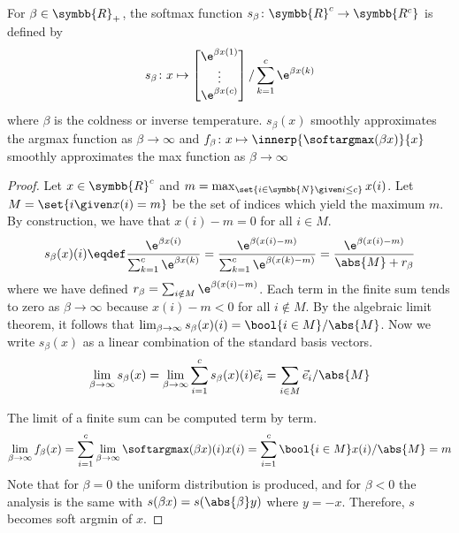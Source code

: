 \begin{lemma}
	For \(\beta \in \symbb{R}_+\), the softmax function \(s_{\beta} \colon \symbb{R}^c \to \symbb{R^c}\) is defined by
	\begin{equation*}
		s_{\beta} \colon x \mapsto \begin{bmatrix}
			\e^{\beta x(1)} \\
			\vdots          \\
			\e^{\beta x(c)}
		\end{bmatrix} / \sum_{k=1}^c \e^{\beta x(k)}
	\end{equation*}
	where \(\beta\) is the coldness or inverse temperature.
	\(s_{\beta}(x)\) smoothly approximates the argmax function as \(\beta \to \infty\) and \(f_{\beta} \colon x \mapsto \innerp{\softargmax(\beta x)}{x}\) smoothly approximates the max function as \(\beta \to \infty\)
\end{lemma}
\begin{proof}
	Let \(x \in \symbb{R}^c\) and \(m = \max_{\set{i \in \symbb{N} \given i \leq c}} x(i)\).
	Let  \(M = \set{i \given x(i) = m}\) be the set of indices which yield the maximum \(m\).
	By construction, we have that \(x(i) - m = 0\) for all \(i \in M\).
	\begin{equation*}
		s_{\beta}(x)(i) \eqdef \frac{\e^{\beta x(i)}}{\sum_{k=1}^c \e^{\beta x(k)}}
		= \frac{\e^{\beta (x(i) - m)}}{\sum_{k=1}^c \e^{\beta (x(k) - m)}}
		= \frac{\e^{\beta (x(i) - m)}}{\abs{M} + r_{\beta}}
	\end{equation*}
	where we have defined \(r_{\beta} = \sum_{i \notin M} \e^{\beta(x(i) -m)}\).
	Each term in the finite sum tends to zero as \(\beta \to \infty\) because \(x(i) - m < 0\) for all \(i \notin M\).
	By the algebraic limit theorem, it follows that \(\lim_{\beta \to \infty} s_{\beta}(x)(i) = \bool{i \in M} / \abs{M}\).
	Now we write \(s_{\beta}(x)\) as a linear combination of the standard basis vectors.
	\[\lim_{\beta \to \infty} s_{\beta}(x) = \lim_{\beta \to \infty} \sum_{i=1}^c s_{\beta}(x)(i) \vec{e}_i = \sum_{i \in M} \vec{e}_i / \abs{M} \]

	The limit of a finite sum can be computed term by term.
	\begin{align*}
		\lim_{\beta \to \infty} f_{\beta}(x) = \sum_{i=1}^c \lim_{\beta \to \infty}  \softargmax(\beta x)(i) x(i)  = \sum_{i=1}^c \bool{i \in M} x(i) / \abs{M} = m
	\end{align*}
	Note that for \(\beta = 0\) the uniform distribution is produced, and for \(\beta < 0\) the analysis is the same with \(s(\beta x) = s(\abs{\beta} y)\) where \(y = -x\).
	Therefore, \(s\) becomes soft argmin of \(x\).
\end{proof}
